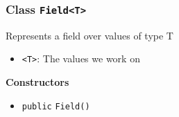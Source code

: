 \subsubsection{Class \lstinline|Field<T>|}
Represents a field over values of type T \\


\begin{itemize}
\item \lstinline|<T>|: The values we work on
\end{itemize}


\textbf{Constructors}
\begin{itemize}
\item \lstinline|public| \lstinline|Field|\lstinline|()|




\end{itemize}


